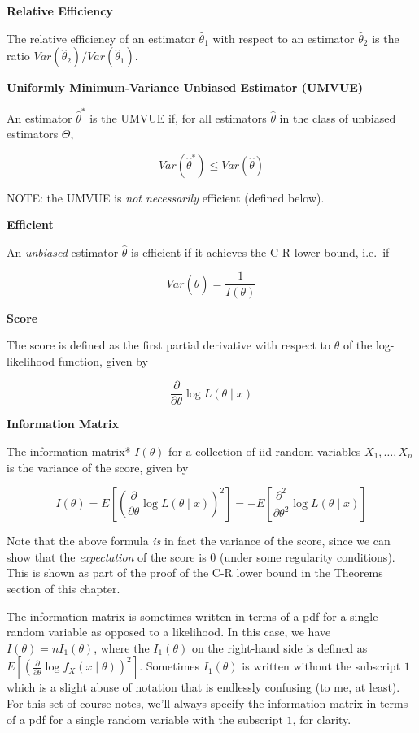 \documentclass[
  letterpaper,
  DIV=11,
  numbers=noendperiod]{scrreprt}
\begin{document}
\textbf{Relative Efficiency}

The relative efficiency of an estimator \(\hat{\theta}_1\) with respect
to an estimator \(\hat{\theta}_2\) is the ratio
\(Var(\hat{\theta}_2)/Var(\hat{\theta}_1)\).

\textbf{Uniformly Minimum-Variance Unbiased Estimator (UMVUE)}

An estimator \(\hat{\theta}^*\) is the UMVUE if, for all estimators
\(\hat{\theta}\) in the class of unbiased estimators \(\Theta\),

\[
Var(\hat{\theta}^*) \leq Var(\hat{\theta})
\]

NOTE: the UMVUE is \emph{not necessarily} efficient (defined below).

\textbf{Efficient}

An \emph{unbiased} estimator \(\hat{\theta}\) is efficient if it
achieves the C-R lower bound, i.e.~if

\[
Var(\hat{\theta}) = \frac{1}{I(\theta)}
\]

\textbf{Score}

The score is defined as the first partial derivative with respect to
\(\theta\) of the log-likelihood function, given by

\[
\frac{\partial}{\partial \theta} \log L(\theta \mid x)
\]

\textbf{Information Matrix}

The information matrix* \(I(\theta)\) for a collection of iid random
variables \(X_1, \dots, X_n\) is the variance of the score, given by

\[
I(\theta) = E \left[ \left( \frac{\partial}{\partial \theta} \log L(\theta \mid x) \right)^2\right] = -E\left[ \frac{\partial^2}{\partial \theta^2} \log L(\theta \mid x)\right]
\]

Note that the above formula \emph{is} in fact the variance of the score,
since we can show that the \emph{expectation} of the score is 0 (under
some regularity conditions). This is shown as part of the proof of the
C-R lower bound in the Theorems section of this chapter.

The information matrix is sometimes written in terms of a pdf for a
single random variable as opposed to a likelihood. In this case, we have
\(I(\theta) = n I_1(\theta)\), where the \(I_1(\theta)\) on the
right-hand side is defined as
\(E \left[ \left( \frac{\partial}{\partial \theta} \log f_X(x \mid \theta) \right)^2\right]\).
Sometimes \(I_1(\theta)\) is written without the subscript \(1\) which
is a slight abuse of notation that is endlessly confusing (to me, at
least). For this set of course notes, we'll always specify the
information matrix in terms of a pdf for a single random variable with
the subscript \(1\), for clarity.
\end{document}
